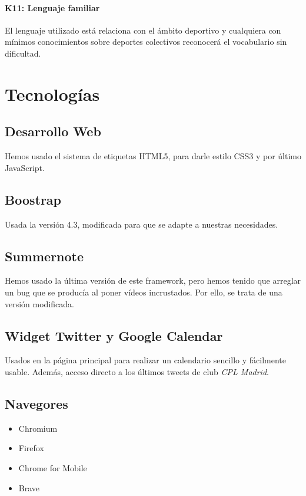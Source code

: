 \documentclass[10pt, spanish, pdftex]{template/UC3M_document}
\begin{document}
\paragraph{K11: Lenguaje familiar}
  El lenguaje utilizado está relaciona con el ámbito deportivo y cualquiera con mínimos conocimientos sobre deportes colectivos reconocerá el vocabulario sin dificultad.



\newpage

\section{Tecnologías}
\subsection{Desarrollo Web}
Hemos usado el sistema de etiquetas HTML5, para darle estilo CSS3 y por último JavaScript.
\subsection{Boostrap}
Usada la versión 4.3, modificada para que se adapte a nuestras necesidades.
\subsection{Summernote}
Hemos usado la última versión de este framework, pero hemos tenido que arreglar un bug que se producía al poner vídeos incrustados. Por ello, se trata de una versión modificada.
\subsection{Widget Twitter y Google Calendar}
Usados en la página principal para realizar un calendario sencillo y fácilmente usable. Además, acceso directo a los últimos tweets de club \textit{CPL Madrid}.
\subsection{Navegores}
\begin{itemize}
  \item Chromium
  \item Firefox
  \item Chrome for Mobile
  \item Brave
\end{itemize}

\newpage
\end{document}

